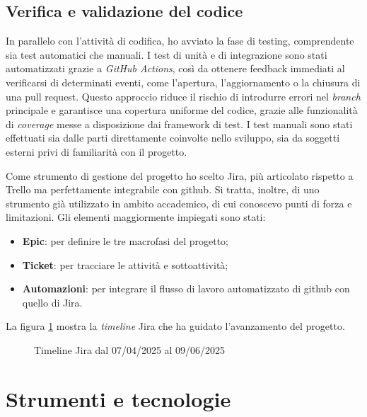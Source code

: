 \subsection{Verifica e validazione del codice}

In parallelo con l’attività di codifica, ho avviato la fase di testing, comprendente sia test automatici che manuali. I test di unità e di integrazione sono stati automatizzati grazie a \textit{GitHub Actions}, così da ottenere feedback immediati al verificarsi di determinati eventi, come l’apertura, l’aggiornamento o la chiusura di una \gls{pull request}. Questo approccio riduce il rischio di introdurre errori nel \textit{branch} principale e garantisce una copertura uniforme del codice, grazie alle funzionalità di \textit{coverage} messe a disposizione dai \gls{framework} di test. I test manuali sono stati effettuati sia dalle parti direttamente coinvolte nello sviluppo, sia da soggetti esterni privi di familiarità con il progetto.

\vspace{10pt}
\noindent Come strumento di gestione del progetto ho scelto Jira, più articolato rispetto a Trello ma perfettamente integrabile con \gls{github}. Si tratta, inoltre, di uno strumento già utilizzato in ambito accademico, di cui conoscevo punti di forza e limitazioni. Gli elementi maggiormente impiegati sono stati:
\begin{itemize}
  \item \textbf{Epic}: per definire le tre macrofasi del progetto;
  \item \textbf{Ticket}: per tracciare le attività e sottoattività;
  \item \textbf{Automazioni}: per integrare il flusso di lavoro automatizzato di \gls{github} con quello di Jira.
\end{itemize}

\vspace{5pt}
\noindent La figura \ref{fig:timeline_jira} mostra la \textit{timeline} Jira che ha guidato l’avanzamento del progetto.

\begin{figure}[H]
  \centering 
  \caption{Timeline Jira dal 07/04/2025 al 09/06/2025}
  \label{fig:timeline_jira}
\end{figure}

\section{Strumenti e tecnologie}
\label{sec:strumenti-tecnologie}

